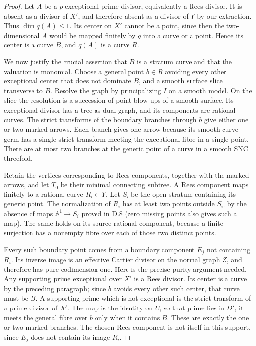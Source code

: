 \begin{proof}
Let $A$ be a $p$-exceptional prime divisor, equivalently a Rees divisor. It is absent as a divisor of $X'$, and therefore absent as a divisor of $Y$ by our extraction. Thus $\dim q(A)\leq1$. Its center on $X'$ cannot be a point, since then the two-dimensional $A$ would be mapped finitely by $q$ into a curve or a point. Hence its center is a curve $B$, and $q(A)$ is a curve $R$.

We now justify the crucial assertion that $B$ is a stratum curve and that the valuation is monomial. Choose a general point $b\in B$ avoiding every other exceptional center that does not dominate $B$, and a smooth surface slice transverse to $B$. Resolve the graph by principalizing $I$ on a smooth model. On the slice the resolution is a succession of point blow-ups of a smooth surface. Its exceptional divisor has a tree as dual graph, and its components are rational curves. The strict transforms of the boundary branches through $b$ give either one or two marked arrows. Each branch gives one arrow because its smooth curve germ has a single strict transform meeting the exceptional fibre in a single point. There are at most two branches at the generic point of a curve in a smooth SNC threefold.

Retain the vertices corresponding to Rees components, together with the marked arrows, and let $T_0$ be their minimal connecting subtree. A Rees component maps finitely to a rational curve $R_i\subset Y$. Let $S_i$ be the open stratum containing its generic point. The normalization of $R_i$ has at least two points outside $S_i$, by the absence of maps $\mathbb A^1\to S_i$ proved in D.8 (zero missing points also gives such a map). The same holds on its source rational component, because a finite surjection has a nonempty fibre over each of those two distinct points.

Every such boundary point comes from a boundary component $E_j$ not containing $R_i$. Its inverse image is an effective Cartier divisor on the normal graph $Z$, and therefore has pure codimension one. Here is the precise purity argument needed. Any supporting prime exceptional over $X'$ is a Rees divisor. Its center is a curve by the preceding paragraph; since $b$ avoids every other such center, that curve must be $B$. A supporting prime which is not exceptional is the strict transform of a prime divisor of $X'$. The map is the identity on $U$, so that prime lies in $D'$; it meets the general fibre over $b$ only when it contains $B$. These are exactly the one or two marked branches. The chosen Rees component is not itself in this support, since $E_j$ does not contain its image $R_i$.


\end{proof}

